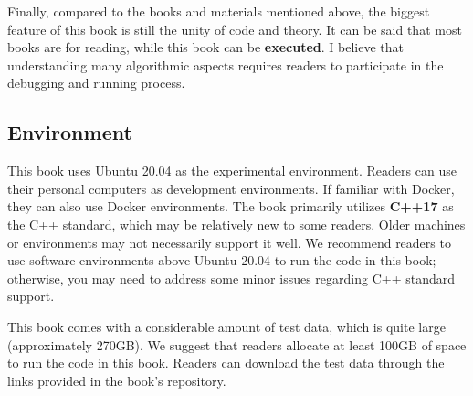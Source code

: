 Finally, compared to the books and materials mentioned above, the biggest feature of this book is still the unity of code and theory. It can be said that most books are for reading, while this book can be \textbf{executed}. I believe that understanding many algorithmic aspects requires readers to participate in the debugging and running process.

\subsection*{Environment}
This book uses Ubuntu 20.04 as the experimental environment. Readers can use their personal computers as development environments. If familiar with Docker, they can also use Docker environments. The book primarily utilizes \textbf{C++17} as the C++ standard, which may be relatively new to some readers. Older machines or environments may not necessarily support it well. We recommend readers to use software environments above Ubuntu 20.04 to run the code in this book; otherwise, you may need to address some minor issues regarding C++ standard support.

This book comes with a considerable amount of test data, which is quite large (approximately 270GB). We suggest that readers allocate at least 100GB of space to run the code in this book. Readers can download the test data through the links provided in the book's repository.

